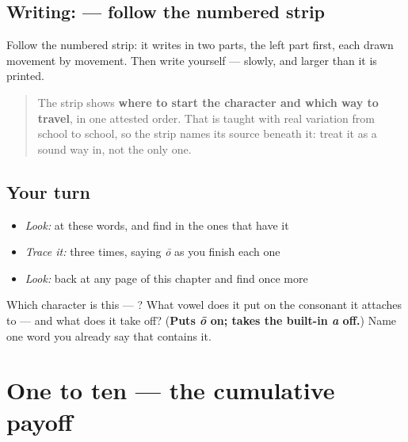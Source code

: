 \subsection*{Writing:  — follow the numbered strip}

Follow the numbered strip: it writes  in two parts, the left part first, each drawn movement by movement. Then write  yourself — slowly, and larger than it is printed.

\begin{quote}
The strip shows \textbf{where to start the character and which way to travel}, in one attested order. That is taught with real variation from school to school, so the strip names its source beneath it: treat it as a sound way in, not the only one.
\end{quote}

\subsection*{Your turn}
\begin{itemize}
\raggedright
  \item \emph{Look:} at these words, and find  in the ones that have it
\end{itemize}

\begin{quote}
\end{quote}

\begin{itemize}
\raggedright
  \item \emph{Trace it:}  three times, saying \emph{ō} as you finish each one
  \item \emph{Look:} back at any page of this chapter and find  once more
\end{itemize}

\begin{tcolorbox}[breakable,colback=teal!4,colframe=teal!35!black,title={Before you move on}]
Which character is this — ? What vowel does it put on the consonant it attaches to — and what does it take off? (\textbf{Puts \emph{ō} on; takes the built-in \emph{a} off.}) Name one word you already say that contains it.
\end{tcolorbox}
\section[Practice]{One to ten — the cumulative payoff}

